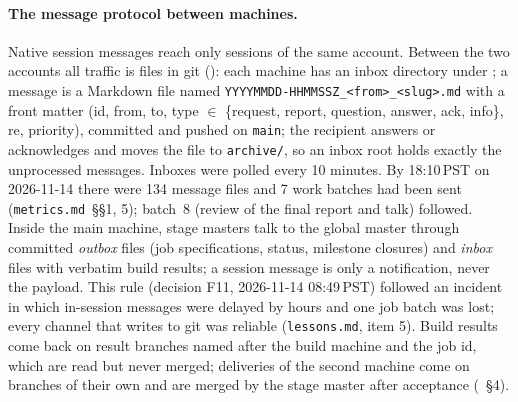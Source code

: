 \begin{sloppypar}
\paragraph{The message protocol between machines.} Native session messages reach only sessions of the same account.
Between the two accounts all traffic is files in git (): each machine has an inbox
directory under ; a message is a Markdown file named
\texttt{YYYYMMDD-HHMMSSZ\_<from>\_<slug>.md} with a front matter (id, from, to, type
$\in$ \{request, report, question, answer, ack, info\}, re, priority), committed and pushed on \texttt{main}; the
recipient answers or acknowledges and moves the file to \texttt{archive/}, so an inbox root holds exactly the
unprocessed messages. Inboxes were polled every 10 minutes. By 18:10\,PST on 2026-11-14 there were 134 message files
and 7 work batches had been sent (\texttt{metrics.md}~\S\S1, 5); batch~8 (review of the final report and talk) followed.
Inside the main machine, stage masters talk to the global master through committed \emph{outbox} files
 (job specifications, status, milestone closures) and \emph{inbox}
files with verbatim build results; a session message is only a notification, never the payload. This rule (decision
F11, 2026-11-14 08:49\,PST) followed an incident in which in-session messages were delayed by hours and one job batch
was lost; every channel that writes to git was reliable (\texttt{lessons.md}, item 5). Build results come back on
result branches named after the build machine and the job id, which are read but never merged; deliveries of the second
machine come on branches of their own and are merged by the stage master after acceptance
(~\S4).


\end{sloppypar}
